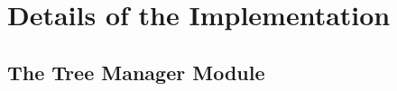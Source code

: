 %


\section{Details of the Implementation}
\label{modules}

\subsection{The Tree Manager Module}
\label{master}

